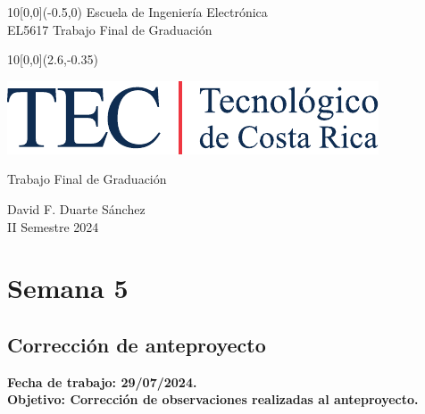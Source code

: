 \documentclass[12pt,letterpaper]{article}
\newcommand{\EstudianteA}{David F. Duarte Sánchez}
\begin{document}
	
\graphicspath{{./}{./fig/}}


%
\begin{textblock}{10}[0,0](-0.5,0)
	\large Escuela de Ingeniería Electrónica \\ 
	EL5617 Trabajo Final de Graduación \\
\end{textblock}

%
\begin{textblock}{10}[0,0](2.6,-0.35)
	\begin{flushright}
		\includegraphics[scale=0.8]{Firma_TEC-4.pdf}
	\end{flushright}
\end{textblock}

\begin{center}
	\vspace{70mm}
	{\large\color{tecRojo} Trabajo Final de Graduación}
	\par\vspace{8mm}
	{\Large\bf\color{tecAzul}{Bitácora de Trabajo - Entrega 1}}
	\par\vspace{100mm}
	{{\EstudianteA \\ II Semestre 2024} 
	\vspace{8mm}}
\end{center}

\newpage

\renewcommand{\baselinestretch}{1.1}    %


\section{Semana 5}
\subsection{Corrección de anteproyecto}

\bf{Fecha de trabajo:} 29/07/2024.\\
\bf{Objetivo:} Corrección de observaciones realizadas al anteproyecto.
\end{document}
